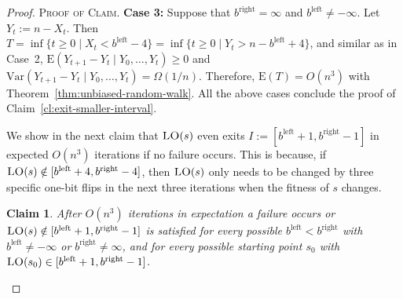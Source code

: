 \documentclass[
sigconf = false, %
review = false, %
screen = true, %
anonymous = true, %
format=acmsmall
]{acmart}
\newcommand*{\E}{\mathrm{E}}
\newcommand{\LO}{\textsc{LO}\xspace}                      %
\newtheorem{claim}{Claim}
\newenvironment{proofofclaim}{\textsc{Proof of Claim.}}{\hfill\scriptsize\scalebox{1}{$\blacksquare$}}
\begin{document}
\begin{proof}
\begin{proofofclaim}
    \textbf{Case 3:} Suppose that $b^{\text{right}} = \infty$ and $b^{\text{left}} \neq -\infty$. Let $Y_t:=n-X_t$. Then $T=\inf\{t \geq 0 \mid X_t < b^{\text{left}}-4\} = \inf\{t \geq 0 \mid Y_t > n-b^{\text{left}}+4\}$, and similar as in Case~2, $\E(Y_{t+1}-Y_t \mid Y_0, \ldots , Y_t) \geq 0$ and $\text{Var}(Y_{t+1}-Y_t \mid Y_0, \ldots , Y_t) = \Omega(1/n)$. Therefore, $\E(T) = O(n^3)$ with Theorem~\ref{thm:unbiased-random-walk}. All the above cases conclude the proof of Claim~\ref{cl:exit-smaller-interval}.
    \end{proofofclaim}

   We show in the next claim that $\LO(s)$ even exits $I:=[b^{\text{left}} +1,b^{\text{right}} - 1]$ in expected $O(n^3)$ iterations if no failure occurs. This is because, if $\LO(s) \notin [b^{\text{left}} +4,b^{\text{right}} - 4]$, then $\LO(s)$ only needs to be changed by three specific one-bit flips in the next three iterations when the fitness of $s$ changes. %
    
    \begin{claim}
    \label{cl:exit-larger-interval}
    After $O(n^3)$ iterations in expectation a failure occurs or $\LO(s) \notin [b^{\text{left}} +1,b^{\text{right}} - 1]$ is satisfied for every possible $b^{\text{left}}<b^{\text{right}}$ with $b^{\text{left}} \neq -\infty$ or $b^{\text{right}} \neq \infty$, and for every possible starting point $s_0$ with $\LO(s_0) \in [b^{\text{left}} +1,b^{\text{right}} - 1]$.
    \end{claim}


\end{proof}
\end{document}
